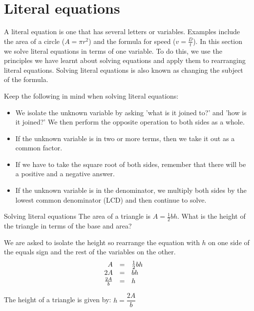 \section{Literal equations}
%             

A literal equation is one that has several letters or variables. Examples include the area of a circle ($A=\pi{r}^{2}$) and the formula for speed ($v=\frac{D}{t}$). In this section we solve literal equations in terms of one variable. To do this, we use the principles we have learnt about solving equations and apply them to rearranging literal equations. Solving literal equations is also known as changing the subject of the formula.
 
Keep the following in mind when solving literal equations:
\begin{itemize}
\item We isolate the unknown variable by asking 'what is it joined to?' and 'how is it joined?' We then perform the opposite operation to both sides as a whole.
\item If the unknown variable is in two or more terms, then we take it out as a common factor. 
\item  If we have to take the square root of both sides, remember that there will be a positive and a negative answer.
\item  If the unknown variable is in the denominator, we multiply both sides by the lowest common denominator (LCD) and then continue to solve.
\end{itemize}


\begin{wex}
{Solving literal equations}
{
The area of a triangle is $A=\frac{1}{2}bh$. What is the height of the triangle in terms of the base and area?
}
{
We are asked to isolate the height so  rearrange the equation with $h$ on one side of the equals sign and the rest of the variables on the other.
\begin{equation*}
    \begin{array}{cccc}\hfill A& =& \frac{1}{2}bh\hfill & \\
	\hfill 2A& =& bh\hfill & \hfill \\
	\hfill \frac{2A}{b}& =& h\hfill 
    \end{array}
\end{equation*}

The height of a triangle is given by: $h=\dfrac{2A}{b}$
} 
\end{wex}


